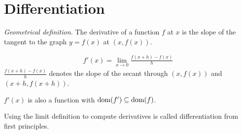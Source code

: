 \section{Differentiation}
\emph{Geometrical definition.}
The derivative of a function $f$ at $x$ is the slope of the tangent to the graph $y= f(x)$ at $(x,f(x))$.
\begin{df}
\begin{align*}
f'(x) = \lim_{x \to 0} \frac{f(x+h) -f(x)}{h}
\end{align*}
$\frac{f(x+h) -f(x)}{h}$ denotes the slope of the secant through  $(x,f(x))$ and $(x+h,f(x+h))$.
\end{df}
\begin{rk}
$f'(x)$ is also a function with $\operatorname{dom}(f') \subseteq \operatorname{dom}(f)$.
\end{rk}
Using the limit definition to compute derivatives is called differentiation from first principles.
